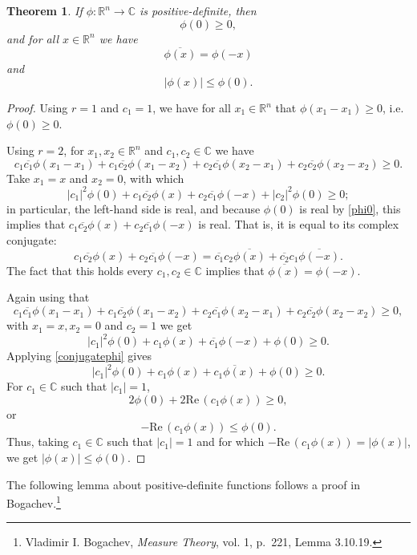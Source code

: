 \documentclass{article}
\def\Re{\ensuremath{\mathrm{Re}}\,}
\newtheorem{theorem}{Theorem}
\theoremstyle{definition}
\begin{document}
\begin{theorem}
If $\phi:\mathbb{R}^n \to \mathbb{C}$ is positive-definite, then
\begin{equation}
\phi(0) \geq 0,
\label{phi0}
\end{equation}
and for all $x \in \mathbb{R}^n$ we have
\begin{equation}
\overline{\phi(x)}=\phi(-x)
\label{conjugatephi}
\end{equation}
and
\begin{equation}
|\phi(x)| \leq \phi(0).
\label{phix}
\end{equation}
\end{theorem}
\begin{proof}
Using $r=1$ and $c_1=1$, we have for all $x_1 \in \mathbb{R}^n$ that
$\phi(x_1-x_1) \geq 0$,
i.e. $\phi(0) \geq 0$.

Using $r=2$,
for $x_1,x_2 \in \mathbb{R}^n$
and $c_1,c_2 \in \mathbb{C}$ we have
\[
c_1\overline{c_1}\phi(x_1-x_1)+c_1\overline{c_2}\phi(x_1-x_2)+c_2\overline{c_1}\phi(x_2-x_1)
+c_2\overline{c_2} \phi(x_2-x_2) \geq 0.
\]
Take $x_1=x$ and $x_2=0$, with which
\[
|c_1|^2 \phi(0) + c_1\overline{c_2} \phi(x)+c_2\overline{c_1}\phi(-x)+|c_2|^2 \phi(0) \geq 0;
\]
in particular, the left-hand side is real, and because $\phi(0)$ is real by \eqref{phi0}, this implies that
$c_1\overline{c_2} \phi(x)+c_2\overline{c_1}\phi(-x)$ is real. That is, it is equal to its complex conjugate:
\[
c_1\overline{c_2} \phi(x)+c_2\overline{c_1}\phi(-x) = \overline{c_1}c_2 \overline{\phi(x)}+\overline{c_2}c_1\overline{\phi(-x)}.
\]
The fact that this holds  every $c_1,c_2 \in \mathbb{C}$ implies that $\overline{\phi(x)} = \phi(-x)$. 

Again using that 
\[
c_1\overline{c_1}\phi(x_1-x_1)+c_1\overline{c_2}\phi(x_1-x_2)+c_2\overline{c_1}\phi(x_2-x_1)
+c_2\overline{c_2} \phi(x_2-x_2) \geq 0,
\]
 with $x_1=x,x_2=0$ and $c_2=1$ we get
\[
|c_1|^2\phi(0) +c_1\phi(x)+\overline{c_1}\phi(-x)+\phi(0) \geq 0.
\]
Applying \eqref{conjugatephi} gives
\[
|c_1|^2 \phi(0)+c_1\phi(x)+\overline{c_1 \phi(x)} + \phi(0) \geq 0.
\]
For $c_1 \in \mathbb{C}$ such that $|c_1|=1$,
\[
2\phi(0) + 2\Re \left( c_1 \phi(x) \right) \geq 0,
\]
or
\[
-\Re \left( c_1 \phi(x) \right) \leq \phi(0).
\]
Thus, taking $c_1 \in \mathbb{C}$ such that $|c_1|=1$ and for which $-\Re \left( c_1 \phi(x) \right) = |\phi(x)|$,
we get $|\phi(x)| \leq \phi(0)$. 
\end{proof}


The following lemma about positive-definite functions follows a proof in Bogachev.\footnote{Vladimir I. Bogachev, {\em Measure Theory}, vol. 1, p.~221, Lemma 3.10.19.}
\end{document}
